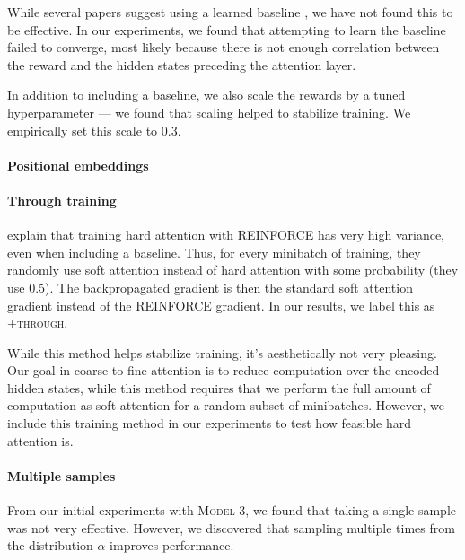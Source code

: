 \documentclass[12pt]{report}
\begin{document}
While several papers suggest using a learned baseline \citep[e.g.][]{mnih2014visualattention, ranzato2015}, we have not found this to be effective. In our experiments, we found that attempting to learn the baseline failed to converge, most likely because there is not enough correlation between the reward and the hidden states preceding the attention layer.

In addition to including a baseline, we also scale the rewards by a tuned hyperparameter --- we found that scaling helped to stabilize training. We empirically set this scale to 0.3.





\paragraph{Positional embeddings} 

\paragraph{Through training} \citet{xu2015captioning} explain that training hard attention with REINFORCE has very high variance, even when including a baseline. Thus, for every minibatch of training, they randomly use soft attention instead of hard attention with some probability (they use 0.5).
The backpropagated gradient is then the standard soft attention gradient instead of the REINFORCE gradient. In our results, we label this as \textsc{+through}.

While this method helps stabilize training, it's aesthetically not very pleasing. Our goal in coarse-to-fine attention is to reduce computation over the encoded hidden states, while this method requires that we perform the full amount of computation as soft attention for a random subset of minibatches. However, we include this training method in our experiments to test how feasible hard attention is.


\paragraph{Multiple samples} 
From our initial experiments with \textsc{Model 3}, we found that taking a single sample was not very effective. However, we discovered that sampling multiple times from the distribution $\alpha$ improves performance.
\end{document}
